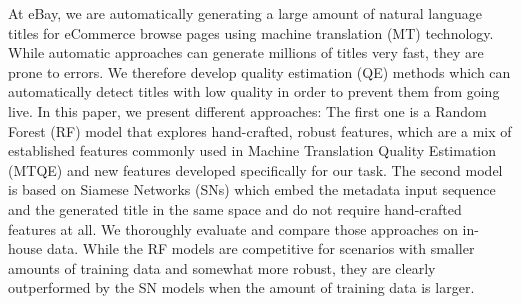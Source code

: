 At eBay, we are automatically generating a large amount of natural language titles for eCommerce browse pages using machine translation (MT) technology. While automatic approaches can generate millions of titles very fast, they are prone to errors. We therefore develop quality estimation (QE) methods which can automatically detect titles with low quality in order to prevent them from going live. In this paper, we present different approaches: The first one is a Random Forest (RF) model that explores hand-crafted, robust features, which are a mix of established features commonly used in Machine Translation Quality Estimation (MTQE) and new features developed specifically for our task. The second model is based on Siamese Networks (SNs) which embed the metadata input sequence and the generated title in the same space and do not require hand-crafted features at all. We thoroughly evaluate and compare those approaches on in-house data. While the RF models are competitive for scenarios with smaller amounts of training data and somewhat more robust, they are clearly outperformed by the SN models when the amount of training data is larger.

